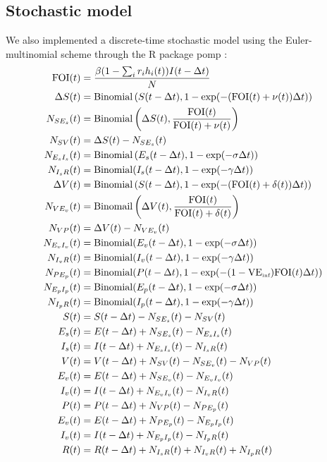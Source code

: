 \documentclass[12pt]{article}
\begin{document}
\subsection*{Stochastic model}

We also implemented a discrete-time stochastic model using the Euler-multinomial scheme through the R package pomp \citep{king2015statistical}:
\begin{align}
\textrm{FOI}(t) &= \frac{\beta (1 - \sum_i r_i h_i(t)) I(t-\Delta t)}{N}\\
\Delta S(t) &= \mathrm{Binomial}\left(S(t-\Delta t),1- \exp(-(\textrm{FOI}(t) + \nu(t)) \Delta t )\right)\\
N_{SE_s}(t) &= \mathrm{Binomial}\left(\Delta S(t), \frac{\textrm{FOI}(t)}{\textrm{FOI}(t) + \nu(t)} \right)\\
N_{SV}(t) &= \Delta S(t) - N_{SE_s}(t)\\
N_{E_sI_s}(t) &= \mathrm{Binomial}\left(E_s(t-\Delta t), 1- \exp(-\sigma \Delta t )\right)\\
N_{I_sR}(t) &= \mathrm{Binomial}(I_s(t-\Delta t), 1- \exp(-\gamma \Delta t))\\
\Delta V(t) &= \mathrm{Binomial}\left( S(t-\Delta t), 1- \exp(-(\textrm{FOI}(t) + \delta(t)) \Delta t )\right)\\
N_{VE_v}(t) &= \mathrm{Binomail}\left(\Delta V(t), \frac{\textrm{FOI}(t)}{\textrm{FOI}(t) + \delta(t)}  \right) \\
N_{VP}(t) &= \Delta V(t) -N_{VE_v}(t)  \\
N_{E_vI_v}(t) &= \mathrm{Binomial}(E_v(t-\Delta t), 1- \exp(-\sigma \Delta t ))\\
N_{I_vR}(t) &= \mathrm{Binomial}(I_v(t-\Delta t), 1- \exp(-\gamma \Delta t ))\\
N_{PE_p}(t) &= \mathrm{Binomial}(P(t-\Delta t), 1-\exp(-(1-\mathrm{VE}_{\textrm{\tiny{inf}}})\textrm{FOI}(t) \Delta t))\\
N_{E_pI_p}(t) &= \mathrm{Binomial}(E_p(t-\Delta t), 1- \exp(-\sigma \Delta t))\\
N_{I_pR}(t) &= \mathrm{Binomial}(I_p(t-\Delta t), 1- \exp(-\gamma \Delta t))\\
S(t) &= S(t-\Delta t) - N_{SE_s}(t) - N_{SV}(t)\\
E_s(t) &= E(t-\Delta t) + N_{SE_s}(t) - N_{E_sI_s}(t)\\
I_s(t) &= I(t-\Delta t) + N_{E_sI_s}(t) - N_{I_sR}(t)\\
V(t) &= V(t-\Delta t) + N_{SV}(t) - N_{SE_v}(t) - N_{VP}(t)\\
E_v(t) &= E(t-\Delta t) + N_{SE_v}(t) - N_{E_vI_v}(t)\\
I_v(t) &= I(t-\Delta t) + N_{E_vI_v}(t) - N_{I_vR}(t)\\
P(t) &= P(t-\Delta t) + N_{VP}(t) - N_{PE_p}(t)\\
E_v(t) &= E(t-\Delta t) + N_{PE_p}(t) - N_{E_pI_p}(t)\\
I_v(t) &= I(t-\Delta t) + N_{E_pI_p}(t) - N_{I_pR}(t)\\
R(t) &= R(t-\Delta t) + N_{I_sR}(t) + N_{I_vR}(t) + N_{I_pR}(t)
\end{align}
\end{document}
